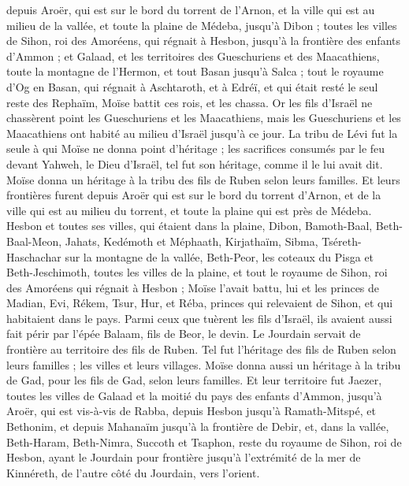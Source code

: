 \begin{multicols}{2}
depuis Aroër, qui est sur le bord du torrent de l’Arnon, et la ville qui est au milieu de la vallée, et toute la plaine de Médeba, jusqu’à Dibon ;
toutes les villes de Sihon, roi des Amoréens, qui régnait à Hesbon, jusqu’à la frontière des enfants d’Ammon ;
et Galaad, et les territoires des Gueschuriens et des Maacathiens, toute la montagne de l’Hermon, et tout Basan jusqu’à Salca ;
tout le royaume d’Og en Basan, qui régnait à Aschtaroth, et à Edréï, et qui était resté le seul reste des Rephaïm, Moïse battit ces rois, et les chassa.
Or les fils d’Israël ne chassèrent point les Gueschuriens et les Maacathiens, mais les Gueschuriens et les Maacathiens ont habité au milieu d’Israël jusqu’à ce jour.
La tribu de Lévi fut la seule à qui Moïse ne donna point d’héritage ; les sacrifices consumés par le feu devant Yahweh, le Dieu d’Israël, tel fut son héritage, comme il le lui avait dit.
Moïse donna un héritage à la tribu des fils de Ruben selon leurs familles.
Et leurs frontières furent depuis Aroër qui est sur le bord du torrent d’Arnon, et de la ville qui est au milieu du torrent, et toute la plaine qui est près de Médeba.
Hesbon et toutes ses villes, qui étaient dans la plaine, Dibon, Bamoth-Baal, Beth-Baal-Meon,
Jahats, Kedémoth et Méphaath,
Kirjathaïm, Sibma, Tséreth-Haschachar sur la montagne de la vallée,
Beth-Peor, les coteaux du Pisga et Beth-Jeschimoth,
toutes les villes de la plaine, et tout le royaume de Sihon, roi des Amoréens qui régnait à Hesbon ; Moïse l’avait battu, lui et les princes de Madian, Evi, Rékem, Tsur, Hur, et Réba, princes qui relevaient de Sihon, et qui habitaient dans le pays.
Parmi ceux que tuèrent les fils d’Israël, ils avaient aussi fait périr par l’épée Balaam, fils de Beor, le devin.
Le Jourdain servait de frontière au territoire des fils de Ruben. Tel fut l’héritage des fils de Ruben selon leurs familles ; les villes et leurs villages.
Moïse donna aussi un héritage à la tribu de Gad, pour les fils de Gad, selon leurs familles.
Et leur territoire fut Jaezer, toutes les villes de Galaad et la moitié du pays des enfants d’Ammon, jusqu’à Aroër, qui est vis-à-vis de Rabba,
depuis Hesbon jusqu’à Ramath-Mitspé, et Bethonim, et depuis Mahanaïm jusqu’à la frontière de Debir,
et, dans la vallée, Beth-Haram, Beth-Nimra, Succoth et Tsaphon, reste du royaume de Sihon, roi de Hesbon, ayant le Jourdain pour frontière jusqu’à l’extrémité de la mer de Kinnéreth, de l’autre côté du Jourdain, vers l’orient.

\end{multicols}
